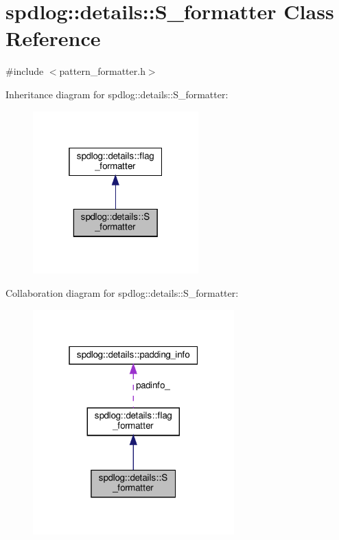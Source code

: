 \hypertarget{classspdlog_1_1details_1_1_s__formatter}{}\section{spdlog\+:\+:details\+:\+:S\+\_\+formatter Class Reference}
\label{classspdlog_1_1details_1_1_s__formatter}


{\ttfamily \#include $<$pattern\+\_\+formatter.\+h$>$}



Inheritance diagram for spdlog\+:\+:details\+:\+:S\+\_\+formatter\+:
\nopagebreak
\begin{figure}[H]
\begin{center}
\leavevmode
\includegraphics[width=181pt]{classspdlog_1_1details_1_1_s__formatter__inherit__graph}
\end{center}
\end{figure}


Collaboration diagram for spdlog\+:\+:details\+:\+:S\+\_\+formatter\+:
\nopagebreak
\begin{figure}[H]
\begin{center}
\leavevmode
\includegraphics[width=220pt]{classspdlog_1_1details_1_1_s__formatter__coll__graph}
\end{center}
\end{figure}
